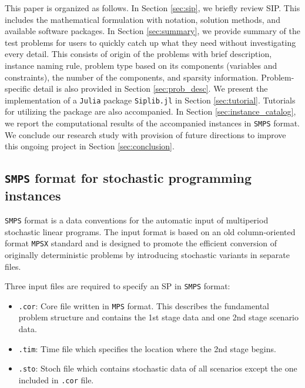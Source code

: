 
This paper is organized as follows. In Section \ref{sec:sip}, we briefly review SIP. This includes the mathematical formulation with notation, solution methods, and available software packages. In Section \ref{sec:summary}, we provide summary of the test problems for users to quickly catch up what they need without investigating every detail. This consists of origin of the problems with brief description, instance naming rule, problem type based on its components (variables and constraints), the number of the components, and sparsity information. Problem-specific detail is also provided in Section \ref{sec:prob_desc}. We present the implementation of a \texttt{Julia} package \texttt{Siplib.jl} in Section \ref{sec:tutorial}. Tutorials for utilizing the package are also accompanied. In Section \ref{sec:instance_catalog}, we report the computational results of the accompanied instances in \texttt{SMPS} format. We conclude our research study with provision of future directions to improve this ongoing project in Section \ref{sec:conclusion}. 



\subsection{\texttt{SMPS} format for stochastic programming instances} \label{subsec:smps}
\texttt{SMPS} format \cite{SMPS} is a data conventions for the automatic input of multiperiod stochastic linear programs. The input format is based on an old column-oriented format \texttt{MPSX} standard and is designed to promote the efficient conversion of originally deterministic problems by introducing stochastic variants in separate files. 

Three input files are required to specify an SP in \texttt{SMPS} format:
\begin{itemize}
	\item \texttt{.cor}: Core file written in \texttt{MPS} format. This describes the fundamental problem structure and contains the 1st stage data and one 2nd stage scenario data.
	\item \texttt{.tim}: Time file which specifies the location where the 2nd stage begins.
	\item \texttt{.sto}: Stoch file which contains stochastic data of all scenarios except the one included in \texttt{.cor} file.
\end{itemize}



